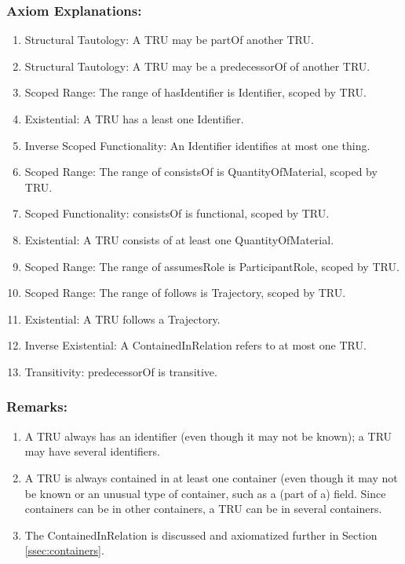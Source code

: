 \subsubsection*{Axiom Explanations:}
\begin{enumerate}
    \item Structural Tautology: A \textsf{TRU} may be \textsf{partOf} another \textsf{TRU}.
    \item Structural Tautology: A \textsf{TRU} may be a \textsf{predecessorOf} of another \textsf{TRU}.
    \item Scoped Range: The range of \textsf{hasIdentifier} is \textsf{Identifier}, scoped by \textsf{TRU}.
    \item Existential: A \textsf{TRU} has a least one \textsf{Identifier}.
    \item Inverse Scoped Functionality: An \textsf{Identifier} identifies at most one thing.
    \item Scoped Range: The range of \textsf{consistsOf} is \textsf{QuantityOfMaterial}, scoped by \textsf{TRU}.
    \item Scoped Functionality: \textsf{consistsOf} is functional, scoped by \textsf{TRU}.
    \item Existential: A \textsf{TRU} consists of at least one \textsf{QuantityOfMaterial}.
    \item Scoped Range: The range of \textsf{assumesRole} is \textsf{ParticipantRole}, scoped by \textsf{TRU}.
    \item Scoped Range: The range of \textsf{follows} is \textsf{Trajectory}, scoped by \textsf{TRU}.
    \item Existential: A \textsf{TRU} follows a \textsf{Trajectory}.
    \item Inverse Existential: A \textsf{ContainedInRelation} refers to at most one \textsf{TRU}.
    \item Transitivity: \textsf{predecessorOf} is transitive.
\end{enumerate}

\subsubsection*{Remarks:}
\begin{enumerate}
    \item A \textsf{TRU} always has an identifier (even though it may not be known); a \textsf{TRU} may have several identifiers. 
    \item A \textsf{TRU} is always contained in at least one container (even though it may not be known or an unusual type of container, such as a (part of a) field. Since containers can be in other containers, a \textsf{TRU} can be in several containers.
    \item The \textsf{ContainedInRelation} is discussed and axiomatized further in Section \ref{ssec:containers}.
\end{enumerate}

